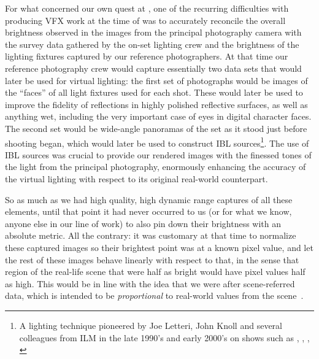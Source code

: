 For what concerned our own quest at , one of the recurring difficulties with 
producing \gls{VFX} work at the time of \cite{hobbit3} was to accurately reconcile 
the overall brightness observed in the images from the principal photography camera
with the survey data gathered by the on-set lighting crew and
the brightness of the lighting fixtures captured by our reference photographers.
At that time our reference photography crew would capture essentially two data sets
that would later be used for \gls{virtual} lighting: the first set of photographs would be 
images of the ``faces'' of all light fixtures used for each shot. 
These would later be used to improve the fidelity of reflections in highly 
polished reflective surfaces, as well as anything wet, 
including the very important case of eyes in digital character faces. 
The second set would be wide-angle panoramas of the set as it stood just before shooting began,
which would later be used to construct \gls{IBL} sources\footnote{ 
	A lighting technique pioneered by Joe Letteri, John Knoll and several colleagues from
	\gls{ILM} in the late 1990's and early 2000's on shows such as 
	\cite{casper95}, \cite{speed297}, \cite{pearlharbor2001}, \cite{lotr-tri}}. 
The use of \gls{IBL} sources was crucial to provide our rendered images with the finessed tones 
of the light from the principal photography, enormously enhancing the accuracy of the \gls{virtual}
lighting with respect to its original real-world counterpart.

So as much as we had high quality, high dynamic range captures of all these elements,
until that point it had never occurred to us (or for what we know, anyone else in our
line of work) to also pin down their brightness with an absolute metric. 
All the contrary: it was customary at that time to normalize these captured images so their 
brightest point was at a known pixel value, and let the rest of these images behave linearly 
with respect to that, in the sense that region of the real-life scene that were half as bright
would have pixel values half as high. This would be in line with the idea that we were after 
\gls{scene-referred} data, which is intended to be \emph{proportional} to real-world values from
the scene~\cite{iso:12231-2:2022,iso:22028-1:2016,iec:60050-845:2020,icc:glossary}.

